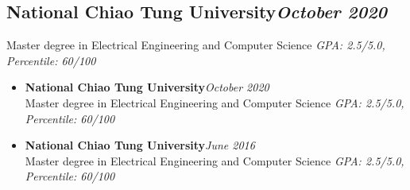 \iftrue
\iffalse
\section{Education}
\large{\textbf{National Chiao Tung University}}\hfill \small{\textit{October 2020}}\\
\small{Master degree in Electrical Engineering and Computer Science}\hfill
\small{\textit{GPA: 3.61, Percentile: 81.48/100}}\\
\noindent
\large{\textbf{National Chiao Tung University}}\hfill \small{\textit{October 2020}}\\
\small{Master degree in Electrical Engineering and Computer Science}\hfill
\small{\textit{GPA: 2.85, Percentile: 73.13/100}}
\fi

\iftrue
\iffalse
\subsection{
\textbf{National Chiao Tung University}\hfill \textmd{\small{\textit{October 2020}}}}
\small{Master degree in Electrical Engineering and Computer Science}\hfill
\small{\textit{GPA: 2.5/5.0, Percentile: 60/100}}

\begin{itemize}[leftmargin=0pt, label={}, itemsep=0pt]

\item{
{\sectionheading\large{\textbf{National Chiao Tung University}}}\hfill {\sectionheading\small{\textit{October 2020}}}\\
{\sectionheading\small{Master degree in Electrical Engineering and Computer Science}}\hfill
{\sectionheading\small{\textit{GPA: 2.5/5.0, Percentile: 60/100}}}\\

}
\item{
{\sectionheading\large{\textbf{National Chiao Tung University}}}\hfill \small{\textit{June 2016}}\\
\small{Master degree in Electrical Engineering and Computer Science}\hfill
\small{\textit{GPA: 2.5/5.0, Percentile: 60/100}}
}

\end{itemize}

